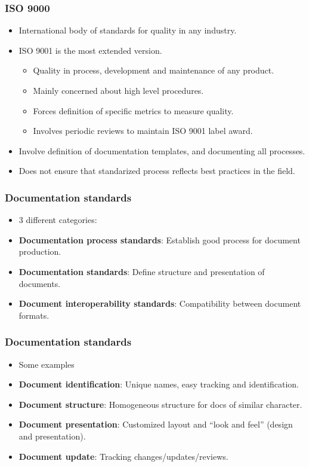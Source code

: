 \documentclass{beamer}
\begin{document}
\begin{frame}
 \frametitle{ISO 9000}
 \begin{itemize}
 \item International body of standards for quality in any industry.
 \item ISO 9001 is the most extended version.
    \begin{itemize}
     \item Quality in process, development and maintenance of any product.
     \item Mainly concerned about high level procedures.
     \item Forces definition of specific metrics to measure quality.
     \item Involves periodic reviews to maintain ISO 9001 label award.
    \end{itemize}
 \item Involve definition of documentation templates, and documenting all processes.
 \item Does not ensure that standarized process reflects best practices in the field.
 \end{itemize}
\end{frame}


\begin{frame}
 \frametitle{Documentation standards}
 \begin{itemize}
 \item 3 different categories:
 \item \textbf{Documentation process standards}: Establish good process for document production.
 \item \textbf{Documentation standards}: Define structure and presentation of documents.
 \item \textbf{Document interoperability standards}: Compatibility between document formats.
 \end{itemize}
\end{frame}


\begin{frame}
 \frametitle{Documentation standards}
 \begin{itemize}
 \item Some examples
 \item \textbf{Document identification}: Unique names, easy tracking and identification.
 \item \textbf{Document structure}: Homogeneous structure for docs of similar character.
 \item \textbf{Document presentation}: Customized layout and ``look and feel'' (design and presentation).
 \item \textbf{Document update}: Tracking changes/updates/reviews.
 \end{itemize}
\end{frame}
\end{document}
